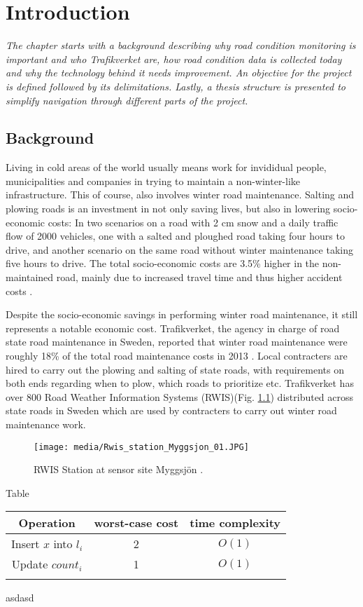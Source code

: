 \chapter{Introduction}
\emph{The chapter starts with a background describing why road condition monitoring is important and who Trafikverket are, how road condition data is collected today and why the technology behind it needs improvement. An objective for the project is defined followed by its delimitations. Lastly, a thesis structure is presented to simplify navigation through different parts of the project.}

\section{Background}
	Living in cold areas of the world usually means work for invididual people, municipalities and companies in trying to maintain a non-winter-like infrastructure. This of course, also involves winter road maintenance. Salting and plowing roads is an investment in not only saving lives, but also in lowering socio-economic costs: In two scenarios on a road with 2 cm snow and a daily traffic flow of 2000 vehicles, one with a salted and ploughed road taking four hours to drive, and another scenario on the same road without winter maintenance taking five hours to drive. The total socio-economic costs are 3.5\% higher in the non-maintained road, mainly due to increased travel time and thus higher accident costs \cite{ARTICLE:1}. 

	Despite the socio-economic savings in performing winter road maintenance, it still represents a notable economic cost. Trafikverket, the agency in charge of road state road maintenance in Sweden, reported that winter road maintenance were roughly 18\% of the total road maintenance costs in 2013 \cite{REPORT:1}. Local contracters are hired to carry out the plowing and salting of state roads, with requirements on both ends regarding when to plow, which roads to prioritize etc. Trafikverket has over 800 Road Weather Information Systems (RWIS)(Fig. \ref{img:rwis}) distributed across state roads in Sweden which are used by contracters to carry out winter road maintenance work. 
\begin{figure}[H]
	\centering
	\texttt{[image: media/Rwis\_station\_Myggsjon\_01.JPG]}
	\caption{RWIS Station at sensor site Myggsjön \cite{IMAGE:1}.}
	\label{img:rwis}
\end{figure}
Table 
\begin{tabular}[3]{c | c | c}
    	Operation & worst-case cost & time complexity \\
    	\hline
    	Insert $x$ into $l_i$ & 2 & $O(1)$  \\
   	Update $count_i$ & 1 &$O(1)$ \\
	\label{table:rwis}
\end{tabular}
asdasd


